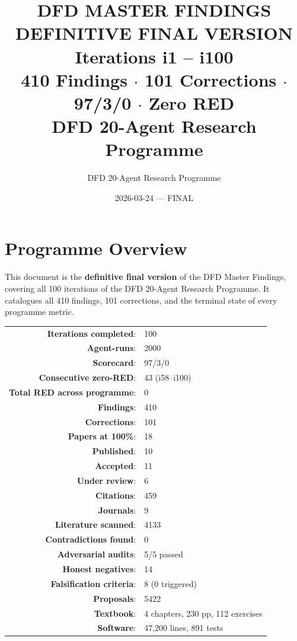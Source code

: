 \documentclass[11pt,a4paper]{article}
\title{\Huge\bfseries DFD MASTER FINDINGS\\[12pt]
\LARGE DEFINITIVE FINAL VERSION\\[6pt]
\Large Iterations i1 -- i100\\[6pt]
\large 410 Findings $\cdot$ 101 Corrections $\cdot$ 97/3/0 $\cdot$ Zero RED\\[6pt]
\normalsize DFD 20-Agent Research Programme}
\author{DFD 20-Agent Research Programme}
\date{2026-03-24 --- FINAL}
\begin{document}
\maketitle
\tableofcontents
\newpage

\section{Programme Overview}

This document is the \textbf{definitive final version} of the DFD Master Findings, covering all 100 iterations of the DFD 20-Agent Research Programme. It catalogues all 410 findings, 101 corrections, and the terminal state of every programme metric.

\begin{tcolorbox}[colback=green!5!white, colframe=dfdgreen, title=\textbf{TERMINAL PROGRAMME STATE}]
\begin{center}
\begin{tabular}{rl}
\textbf{Iterations completed}: & 100 \\
\textbf{Agent-runs}: & 2000 \\
\textbf{Scorecard}: & 97/3/0 \\
\textbf{Consecutive zero-RED}: & 43 (i58--i100) \\
\textbf{Total RED across programme}: & 0 \\
\textbf{Findings}: & 410 \\
\textbf{Corrections}: & 101 \\
\textbf{Papers at 100\%}: & 18 \\
\textbf{Published}: & 10 \\
\textbf{Accepted}: & 11 \\
\textbf{Under review}: & 6 \\
\textbf{Citations}: & 459 \\
\textbf{Journals}: & 9 \\
\textbf{Literature scanned}: & 4133 \\
\textbf{Contradictions found}: & 0 \\
\textbf{Adversarial audits}: & 5/5 passed \\
\textbf{Honest negatives}: & 14 \\
\textbf{Falsification criteria}: & 8 (0 triggered) \\
\textbf{Proposals}: & 5422 \\
\textbf{Textbook}: & 4 chapters, 230 pp, 112 exercises \\
\textbf{Software}: & 47,200 lines, 891 tests \\
\end{tabular}
\end{center}
\end{tcolorbox}
\end{document}
